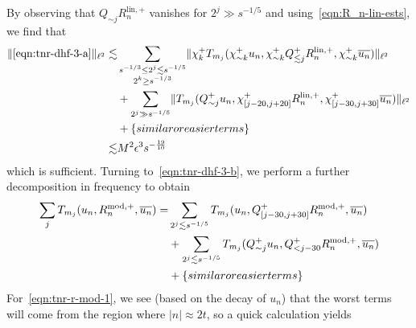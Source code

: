 \documentclass[letterpaper, reqno,final]{amsart}
\newcommand{\btext}[1]{\left\{\textup{#1}\right\}}
\newcommand{\bsime}{\btext{similar or easier terms}}
\begin{document}
By observing that $Q_{\sim j} R_n^{\text{lin},+}$ vanishes for $2^j \gg s^{-1/5}$ and using~\eqref{eqn:R_n-lin-ests}, we find that
\begin{equation*}\begin{split}
    \lVert \eqref{eqn:tnr-dhf-3-a} \rVert_{\ell^2} \lesssim& \sum_{\substack{s^{-1/3} \leq 2^j \lesssim s^{-1/5}\\ 2^k \geq s^{-1/3}}} \lVert \chi_{k}^+ T_{m_j}(\chi_{\sim k}^+u_n, \chi_{\sim k}^+ Q_{\lesssim j}^+ R_n^{\text{lin},+}, \chi_{\sim k}^+\overline{u_n})\rVert_{\ell^2}\\
    &+ \sum_{{2^j \gg s^{-1/5}}} \lVert T_{m_j}(Q^+_{\sim j} u_n, \chi_{[j - 20, j+20]}^+R_n^{\text{lin},+}, \chi_{[j - 30, j+30]}^+\overline{u_n})\rVert_{\ell^2}\\
    &+ \btext{similar or easier terms}\\
    \lesssim& M^2\epsilon^3 s^{-\frac{19}{10}}
\end{split}\end{equation*}
which is sufficient.  Turning to~\eqref{eqn:tnr-dhf-3-b}, we perform a further decomposition in frequency to obtain
\begin{subequations}\begin{align}
    \sum_{j} T_{m_j}(u_n, R_n^{\text{mod},+}, \overline{u_n}) =& \sum_{2^j \lesssim s^{-1/5}} T_{m_j}(u_n, Q_{[j-30, j+30]}^+ R_n^{\text{mod},+}, \overline{u_n})\label{eqn:tnr-r-mod-1}\\
    &+ \sum_{2^j \lesssim s^{-1/5}} T_{m_j}(Q_{\sim j}^+ u_n,  Q_{< j - 30}^+ R_n^{\text{mod},+}, \overline{u_n}) \label{eqn:tnr-r-mod-2}\\
    &+ \bsime\notag
\end{align}
\end{subequations}
For~\eqref{eqn:tnr-r-mod-1}, we see (based on the decay of $u_n$) that the worst terms will come from the region where $|n| \approx 2t$, so a quick calculation yields
\end{document}

